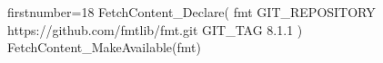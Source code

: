 \begin{cmakecode*}{firstnumber=18}
FetchContent_Declare(
  fmt
  GIT_REPOSITORY https://github.com/fmtlib/fmt.git
  GIT_TAG        8.1.1
)
FetchContent_MakeAvailable(fmt)
\end{cmakecode*}